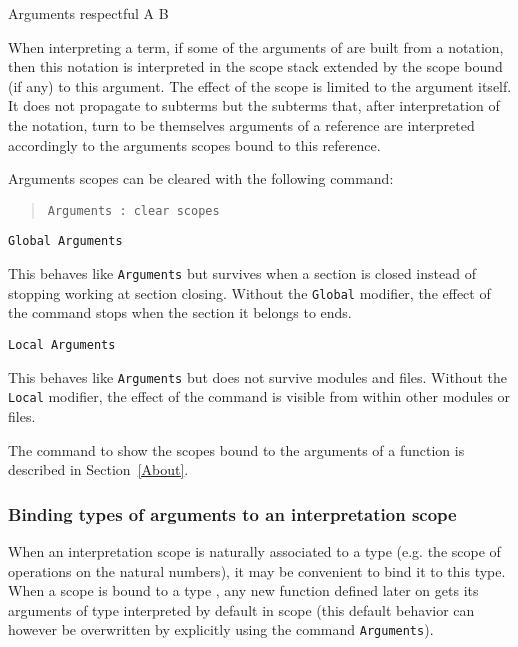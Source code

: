\begin{coq_example*}
Arguments respectful {A B}%
\end{coq_example*}

When interpreting a term, if some of the arguments of {\qualid} are
built from a notation, then this notation is interpreted in the scope
stack extended by the scope bound (if any) to this argument. The
effect of the scope is limited to the argument itself. It does not propagate 
to subterms but the subterms that, after interpretation of the
notation, turn to be themselves arguments of a reference are
interpreted accordingly to the arguments scopes bound to this reference.

Arguments scopes can be cleared with the following command:

\begin{quote}
{\tt Arguments {\qualid} : clear scopes}
\end{quote}

\begin{Variants}
\item {\tt Global Arguments} {\qualid} \nelist{\name {\tt \%}\scope}{}

This behaves like {\tt Arguments} {\qualid} \nelist{\name {\tt \%}\scope}{}
but survives when a section is closed instead
of stopping working at section closing. Without the {\tt Global} modifier,
the effect of the command stops when the section it belongs to ends.

\item {\tt Local Arguments} {\qualid} \nelist{\name {\tt \%}\scope}{}

This behaves like {\tt Arguments} {\qualid} \nelist{\name {\tt \%}\scope}{}
but does not survive modules and files.
Without the {\tt Local} modifier, the effect of the command is
visible from within other modules or files.

\end{Variants}

\SeeAlso The command to show the scopes bound to the arguments of a
function is described in Section~\ref{About}.

\subsubsection{Binding types of arguments to an interpretation scope}

When an interpretation scope is naturally associated to a type
(e.g. the scope of operations on the natural numbers), it may be
convenient to bind it to this type. When a scope {\scope} is bound to
a type {\type}, any new function defined later on gets its arguments
of type {\type} interpreted by default in scope {\scope} (this default
behavior can however be overwritten by explicitly using the command
{\tt Arguments}).

